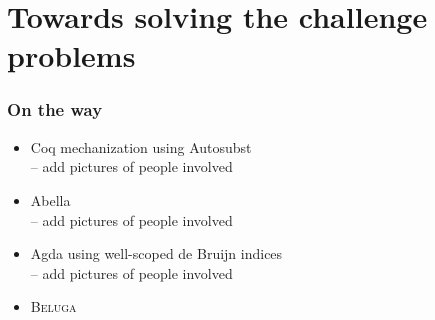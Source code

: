 \documentclass{beamer}
\newcommand{\beluga}{\textsc{Beluga}}
\begin{document}
\section{Towards solving the challenge problems}

\begin{frame}
  \frametitle{On the way}
  
  \begin{itemize}
  \item Coq mechanization using Autosubst
\\ -- add pictures of people involved

  \item Abella\\
-- add pictures of people involved

  \item Agda using well-scoped de Bruijn indices
\\ -- add pictures of people involved

\item \beluga
  \end{itemize}
\end{frame}
\end{document}
